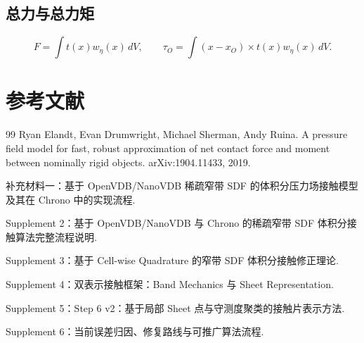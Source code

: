 \documentclass[12pt,a4paper]{ctexart}
\begin{document}
\subsection*{总力与总力矩}
\begin{equation}
    F = \int t(x)w_\eta(x)\,dV,
    \qquad
    \tau_O = \int (x-x_O)\times t(x)w_\eta(x)\,dV.
\end{equation}

\section{参考文献}
\begin{thebibliography}{99}
Ryan Elandt, Evan Drumwright, Michael Sherman, Andy Ruina.
\newblock A pressure field model for fast, robust approximation of net contact force and moment between nominally rigid objects.
\newblock arXiv:1904.11433, 2019.

补充材料一：基于 OpenVDB/NanoVDB 稀疏窄带 SDF 的体积分压力场接触模型及其在 Chrono 中的实现流程.

Supplement 2：基于 OpenVDB/NanoVDB 与 Chrono 的稀疏窄带 SDF 体积分接触算法完整流程说明.

Supplement 3：基于 Cell-wise Quadrature 的窄带 SDF 体积分接触修正理论.

Supplement 4：双表示接触框架：Band Mechanics 与 Sheet Representation.

Supplement 5：Step 6 v2：基于局部 Sheet 点与守测度聚类的接触片表示方法.

Supplement 6：当前误差归因、修复路线与可推广算法流程.
\end{thebibliography}
\end{document}
